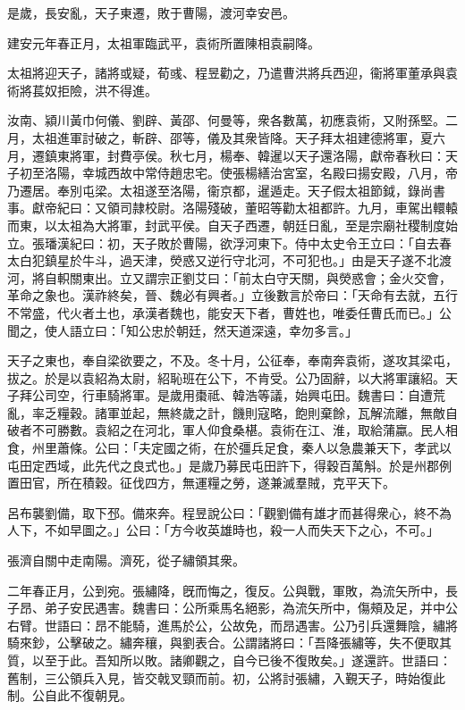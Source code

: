 \begin{pinyinscope}
是歲，長安亂，天子東遷，敗于曹陽，渡河幸安邑。

建安元年春正月，太祖軍臨武平，袁術所置陳相袁嗣降。

太祖將迎天子，諸將或疑，荀彧、程昱勸之，乃遣曹洪將兵西迎，衞將軍董承與袁術將萇奴拒險，洪不得進。

汝南、潁川黃巾何儀、劉辟、黃邵、何曼等，衆各數萬，初應袁術，又附孫堅。二月，太祖進軍討破之，斬辟、邵等，儀及其衆皆降。天子拜太祖建德將軍，夏六月，遷鎮東將軍，封費亭侯。秋七月，楊奉、韓暹以天子還洛陽，獻帝春秋曰：天子初至洛陽，幸城西故中常侍趙忠宅。使張楊繕治宮室，名殿曰揚安殿，八月，帝乃遷居。奉別屯梁。太祖遂至洛陽，衞京都，暹遁走。天子假太祖節鉞，錄尚書事。獻帝紀曰：又領司隷校尉。洛陽殘破，董昭等勸太祖都許。九月，車駕出轘轅而東，以太祖為大將軍，封武平侯。自天子西遷，朝廷日亂，至是宗廟社稷制度始立。張璠漢紀曰：初，天子敗於曹陽，欲浮河東下。侍中太史令王立曰：「自去春太白犯鎮星於牛斗，過天津，熒惑又逆行守北河，不可犯也。」由是天子遂不北渡河，將自軹關東出。立又謂宗正劉艾曰：「前太白守天關，與熒惑會；金火交會，革命之象也。漢祚終矣，晉、魏必有興者。」立後數言於帝曰：「天命有去就，五行不常盛，代火者土也，承漢者魏也，能安天下者，曹姓也，唯委任曹氏而已。」公聞之，使人語立曰：「知公忠於朝廷，然天道深遠，幸勿多言。」

天子之東也，奉自梁欲要之，不及。冬十月，公征奉，奉南奔袁術，遂攻其梁屯，拔之。於是以袁紹為太尉，紹恥班在公下，不肯受。公乃固辭，以大將軍讓紹。天子拜公司空，行車騎將軍。是歲用棗祗、韓浩等議，始興屯田。魏書曰：自遭荒亂，率乏糧穀。諸軍並起，無終歲之計，饑則寇略，飽則棄餘，瓦解流離，無敵自破者不可勝數。袁紹之在河北，軍人仰食桑椹。袁術在江、淮，取給蒲蠃。民人相食，州里蕭條。公曰：「夫定國之術，在於彊兵足食，秦人以急農兼天下，孝武以屯田定西域，此先代之良式也。」是歲乃募民屯田許下，得穀百萬斛。於是州郡例置田官，所在積穀。征伐四方，無運糧之勞，遂兼滅羣賊，克平天下。

呂布襲劉備，取下邳。備來奔。程昱說公曰：「觀劉備有雄才而甚得衆心，終不為人下，不如早圖之。」公曰：「方今收英雄時也，殺一人而失天下之心，不可。」

張濟自關中走南陽。濟死，從子繡領其衆。

二年春正月，公到宛。張繡降，旣而悔之，復反。公與戰，軍敗，為流矢所中，長子昂、弟子安民遇害。魏書曰：公所乘馬名絕影，為流矢所中，傷頰及足，并中公右臂。世語曰：昂不能騎，進馬於公，公故免，而昂遇害。公乃引兵還舞陰，繡將騎來鈔，公擊破之。繡奔穰，與劉表合。公謂諸將曰：「吾降張繡等，失不便取其質，以至于此。吾知所以敗。諸卿觀之，自今已後不復敗矣。」遂還許。世語曰：舊制，三公領兵入見，皆交戟叉頸而前。初，公將討張繡，入覲天子，時始復此制。公自此不復朝見。


\end{pinyinscope}
